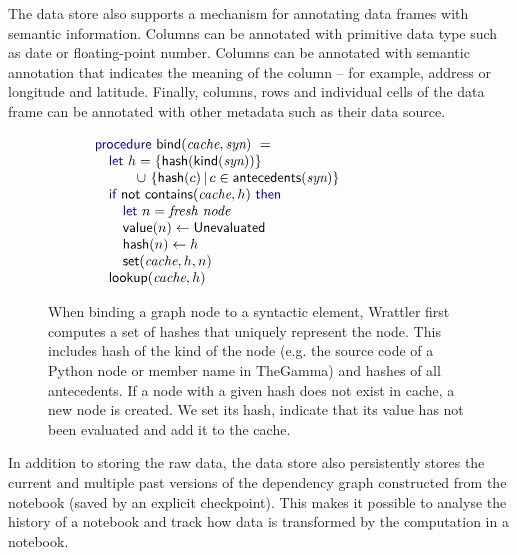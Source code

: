 \documentclass[sigplan]{acmart}\settopmatter{printfolios=true,printccs=false,printacmref=false}
\begin{document}
The data store also supports a mechanism for annotating data frames with 
semantic information. Columns can be annotated with primitive data type such as 
date or floating-point number. Columns can be annotated with semantic annotation that indicates
the meaning of the column -- for example, address or longitude and latitude. Finally, columns,
rows and individual cells of the data frame can be annotated with other metadata such as their
data source.

\begin{figure}
\vspace{-1em}
\begin{equation*}
\hspace{-6em}\begin{array}{l}
\kvd{procedure}~\ident{bind}(\textit{cache}, \textit{syn})~=\\
\quad \kvd{let}~h = \{ \ident{hash}(\ident{kind}(\textit{syn})) \} \\  
\quad \qquad \cup~ \{\ident{hash}(c) \,|\, c\in\ident{antecedents}(\textit{syn}) \}\\
\quad \kvd{if}~\ident{not}~\ident{contains}(\textit{cache}, h)~\kvd{then}\\
\quad \quad \kvd{let}~n = \emph{fresh node}\\
\quad \quad \ident{value}(n) \leftarrow \ident{Unevaluated} \\
\quad \quad \ident{hash}(n) \leftarrow h\\
\quad \quad \ident{set}(\textit{cache}, h, n) \\
\quad \ident{lookup}(\textit{cache}, h)\\
\end{array}
\end{equation*}
\vspace{-0.5em}
\caption{\small{When binding a graph node to a syntactic element, Wrattler first computes
  a set of hashes that uniquely represent the node. This includes hash of the kind of the 
  node (e.g. the source code of a Python node or member name in TheGamma) and hashes
  of all antecedents. If a node with a given hash does not exist in cache, a new node
  is created. We set its hash, indicate that its value has not been evaluated and
  add it to the cache.}}
\label{fig:bind}
\end{figure}

In addition to storing the raw data, the data store also persistently stores the current and
multiple past versions of the dependency graph constructed from the notebook (saved by an 
explicit checkpoint). This makes it possible to analyse the history of a notebook and track how
data is transformed by the computation in a notebook.
\end{document}

